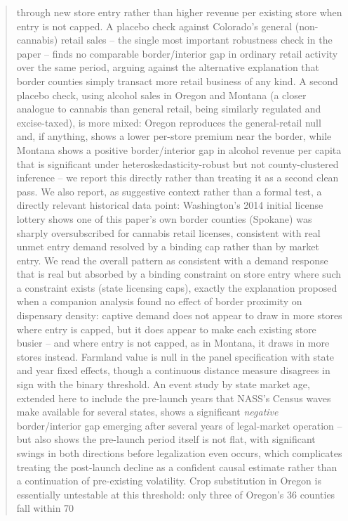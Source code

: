 ﻿\documentclass{article}
\begin{document}
\begin{abstract}
through new store entry rather than higher revenue per existing store when entry is not capped. A placebo
check against Colorado's general (non-cannabis) retail sales -- the single most important robustness check
in the paper -- finds no comparable border/interior gap in ordinary retail activity over the same period,
arguing against the alternative explanation that border counties simply transact more retail business of
any kind. A second placebo check, using alcohol sales in Oregon and Montana (a closer analogue to cannabis
than general retail, being similarly regulated and excise-taxed), is more mixed: Oregon reproduces the
general-retail null and, if anything, shows a lower per-store premium near the border, while Montana shows
a positive border/interior gap in alcohol revenue per capita that is significant under heteroskedasticity-robust
but not county-clustered inference -- we report this directly rather than treating it as a second clean
pass. We also report, as suggestive context rather than a formal test, a directly relevant historical
data point: Washington's 2014 initial license lottery shows one of this paper's own border counties
(Spokane) was sharply oversubscribed for cannabis retail licenses, consistent with real unmet entry demand
resolved by a binding cap rather than by market entry. We read the overall pattern as consistent with a
demand response that is real but absorbed by a binding constraint on store entry where such a constraint
exists (state licensing caps), exactly the explanation proposed when a companion analysis found no effect
of border proximity on dispensary density: captive demand does not appear to draw in more stores where
entry is capped, but it does appear to make each existing store busier -- and where entry is not capped, as
in Montana, it draws in more stores instead. Farmland value is null in the panel specification with state and year fixed
effects, though a continuous distance measure disagrees in sign with the binary threshold. An event study
by state market age, extended here to include the pre-launch years that NASS's Census waves make available
for several states, shows a significant \emph{negative} border/interior gap emerging after several years of
legal-market operation -- but also shows the pre-launch period itself is not flat, with significant swings
in both directions before legalization even occurs, which complicates treating the post-launch decline as a
confident causal estimate rather than a continuation of pre-existing volatility. Crop substitution
in Oregon is essentially untestable at this threshold: only three of Oregon's 36 counties fall within 70

\end{abstract}
\end{document}
